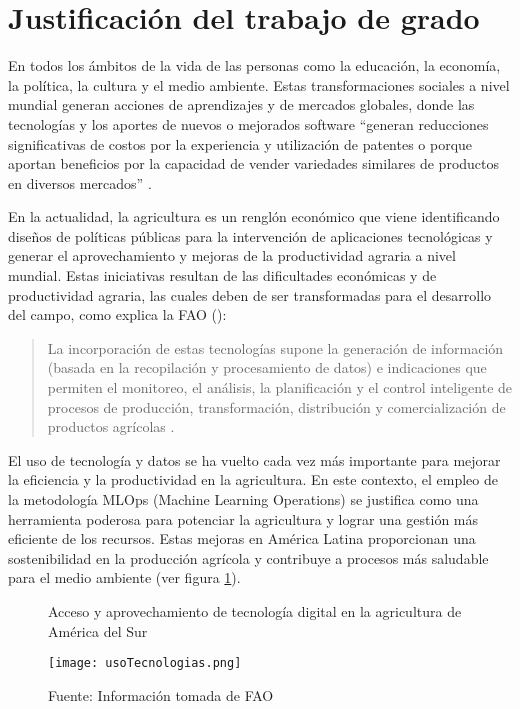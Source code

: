 \section{Justificación del trabajo de grado}
En todos los ámbitos de la vida de las personas como la educación, la economía, la política, la cultura y el medio ambiente. Estas transformaciones sociales a nivel mundial generan acciones de aprendizajes y de mercados globales, donde las tecnologías y los aportes de nuevos o mejorados software “generan reducciones significativas de costos por la experiencia y utilización de patentes o porque aportan beneficios por la capacidad de vender variedades similares de productos en diversos mercados” \citep[p. 27]{vela2012}.

En la actualidad, la agricultura es un renglón económico que viene identificando diseños de políticas públicas para la intervención de aplicaciones tecnológicas y generar el aprovechamiento y mejoras de la productividad agraria a nivel mundial. Estas iniciativas resultan de las dificultades económicas y de productividad agraria, las cuales deben de ser transformadas para el desarrollo del campo, como explica la FAO (\citeyear{fao2021}):

\begin{quote}
    La incorporación de estas tecnologías supone la generación de información (basada en la recopilación y procesamiento de datos) e indicaciones que permiten el monitoreo, el análisis, la planificación y el control inteligente de procesos de producción, transformación, distribución y comercialización de productos agrícolas \cite[p.88]{fao2021}.
\end{quote}


El uso de tecnología y datos se ha vuelto cada vez más importante para mejorar la eficiencia y la productividad en la agricultura. En este contexto, el empleo de la metodología MLOps (Machine Learning Operations) se justifica como una herramienta poderosa para potenciar la agricultura y lograr una gestión más eficiente de los recursos. Estas mejoras en América Latina proporcionan una sostenibilidad en la producción agrícola y contribuye a procesos más saludable para el medio ambiente (ver figura \ref{fig:figura1}).

\begin{figure}[h]
\centering
\caption{Acceso y aprovechamiento de tecnología digital en la agricultura de América del Sur}
\texttt{[image: usoTecnologias.png]}
\caption*{\footnotesize Fuente: Información tomada de FAO \citeyear{fao2021}}
\label{fig:figura1}
\end{figure}

